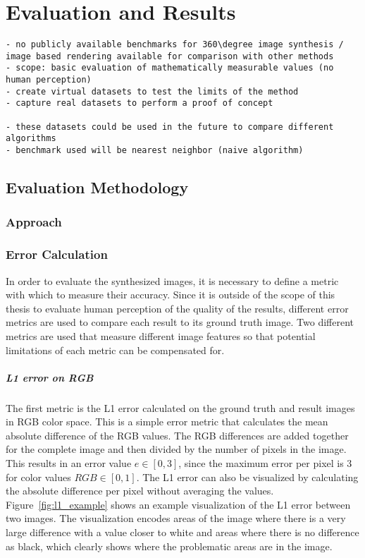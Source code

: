 \chapter{Evaluation and Results} \label{chap:evaluation}


\begin{verbatim}
- no publicly available benchmarks for 360\degree image synthesis / image based rendering available for comparison with other methods
- scope: basic evaluation of mathematically measurable values (no human perception)
- create virtual datasets to test the limits of the method
- capture real datasets to perform a proof of concept

- these datasets could be used in the future to compare different algorithms
- benchmark used will be nearest neighbor (naive algorithm)
\end{verbatim}

\section{Evaluation Methodology}
\subsection{Approach}
\subsection{Error Calculation}
In order to evaluate the synthesized images, it is necessary to define a metric with which to measure their accuracy. Since it is outside of the scope of this thesis to evaluate human perception of the quality of the results, different error metrics are used to compare each result to its ground truth image. Two different metrics are used that measure different image features so that potential limitations of each metric can be compensated for.

\paragraph{L1 error on RGB}
The first metric is the L1 error calculated on the ground truth and result images in RGB color space. This is a simple error metric that calculates the mean absolute difference of the RGB values. The RGB differences are added together for the complete image and then divided by the number of pixels in the image. This results in an error value $e \in [0,3]$, since the maximum error per pixel is 3 for color values $RGB \in [0,1]$. The L1 error can also be visualized by calculating the absolute difference per pixel without averaging the values. Figure~\ref{fig:l1_example} shows an example visualization of the L1 error between two images. The visualization encodes areas of the image where there is a very large difference with a value closer to white and areas where there is no difference as black, which clearly shows where the problematic areas are in the image. 

